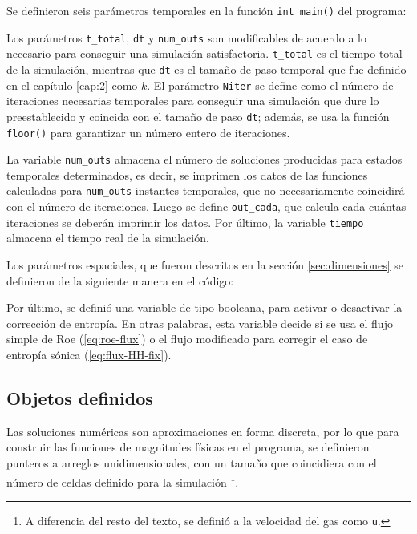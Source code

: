 

Se definieron seis parámetros temporales en la función \texttt{int main()} del programa:


Los parámetros \texttt{t\_total}, \texttt{dt} y \texttt{num\_outs} son modificables de acuerdo a lo necesario para conseguir una simulación satisfactoria. \texttt{t\_total} es el tiempo total de la simulación, mientras que \texttt{dt} es el tamaño de paso temporal que fue definido en el capítulo \ref{cap:2} como $k$. El parámetro \texttt{Niter} se define como el número de iteraciones necesarias temporales para conseguir una simulación que dure lo preestablecido y coincida con el tamaño de paso \texttt{dt}; además, se usa la función \texttt{floor()} para garantizar un número entero de iteraciones. 

La variable \texttt{num\_outs} almacena el número de soluciones producidas para estados temporales determinados, es decir, se imprimen los datos de las funciones calculadas para \texttt{num\_outs} instantes temporales, que no necesariamente coincidirá con el número de iteraciones. Luego se define \texttt{out\_cada}, que calcula cada cuántas iteraciones se deberán imprimir los datos. Por último, la variable \texttt{tiempo} almacena el tiempo real de la simulación.

Los parámetros espaciales, que fueron descritos en la sección \ref{sec:dimensiones} se definieron de la siguiente manera en el código:


Por último, se definió una variable de tipo booleana, para activar o desactivar la corrección de entropía. En otras palabras, esta variable decide si se usa el flujo simple de Roe (\ref{eq:roe-flux}) o el flujo modificado para corregir el caso de entropía sónica (\ref{eq:flux-HH-fix}).

\subsection{Objetos definidos}
Las soluciones numéricas son aproximaciones en forma discreta, por lo que para construir las funciones de magnitudes físicas en el programa, se definieron punteros a arreglos unidimensionales, con un tamaño que coincidiera con el número de celdas definido para la simulación \footnote{A diferencia del resto del texto, se definió a la velocidad del gas como \texttt{u}.}.


